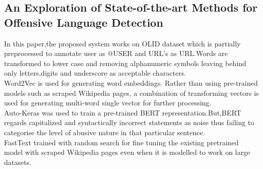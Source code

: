 \documentclass[12pt,a4paper]{article}
\begin{document}
\subsection{An Exploration of State-of-the-art Methods for Offensive Language Detection\cite{stateofartSemEvalT6}}
In this paper,the proposed system works on OLID dataset which is partially preprocessed to annotate user as @USER and URL's as URL.Words are transformed to lower case and removing alphanumeric symbols leaving behind only letters,digits and underscore as acceptable characters.\\
 Word2Vec is used for generating word embeddings. Rather than using pre-trained models such as scraped Wikipedia pages, a combination of transforming vectors is used for generating multi-word single vector for further processing.\\
Auto-Keras was used to train a pre-trained BERT representation.But,BERT regards capitalized and syntactically incorrect statements as noise thus failing to categorise the level of abusive nature in that particular sentence.\\
 FastText trained with random search for fine tuning the existing pretrained model with scraped Wikipedia pages even when it is modelled to work on large datasets. 
\end{document}
